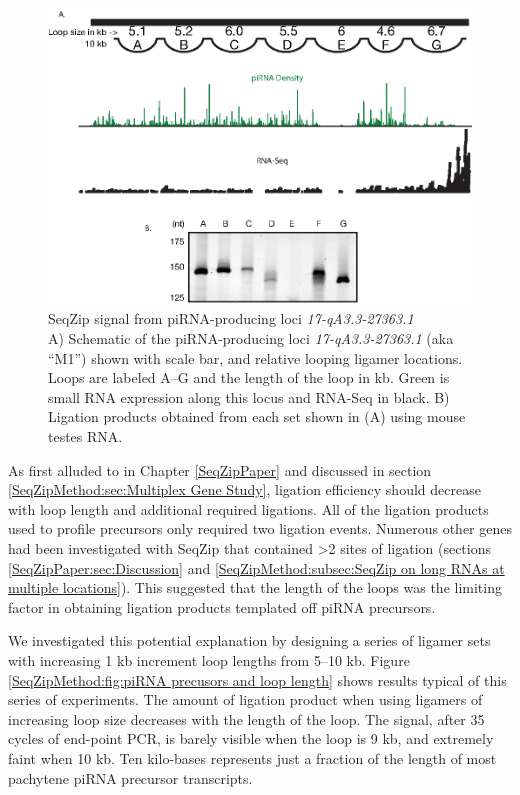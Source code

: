     \begin{figure} %
        \centering 
        \includegraphics{Figures/SeqZipMethod/piRNAPrecurserAnalyisBySeqZip.eps}
        \caption[SeqZip signal from piRNA-producing loci \textit{17-qA3.3-27363.1}]
        {
          SeqZip signal from piRNA-producing loci \textit{17-qA3.3-27363.1}\\[0.25cm]
          A) Schematic of the piRNA-producing loci \textit{17-qA3.3-27363.1} (aka ``M1'') shown with scale bar, and relative looping ligamer locations.  Loops are labeled A--G and the length of the loop in kb.  Green is small RNA expression along this locus and RNA-Seq in black. B) Ligation products obtained from each set shown in (A) using mouse testes RNA.
        	}
        \label{SeqZipMethod:fig:M1 analysis by SeqZip}
      	\end{figure}

    As first alluded to in Chapter \ref{SeqZipPaper} and discussed in section \ref{SeqZipMethod:sec:Multiplex Gene Study}, ligation efficiency should decrease with loop length and additional required ligations. All of the ligation products used to profile precursors only required two ligation events. Numerous other genes had been investigated with SeqZip that contained >2 sites of ligation (sections \ref{SeqZipPaper:sec:Discussion} and \ref{SeqZipMethod:subsec:SeqZip on long RNAs at multiple locations}). This suggested that the length of the loops was the limiting factor in obtaining ligation products templated off piRNA precursors.

    We investigated this potential explanation by designing a series of ligamer sets with increasing 1 kb increment loop lengths from 5--10 kb. Figure \ref{SeqZipMethod:fig:piRNA precusors and loop length} shows results typical of this series of experiments. The amount of ligation product when using ligamers of increasing loop size decreases with the length of the loop. The signal, after 35 cycles of end-point PCR, is barely visible when the loop is 9 kb, and extremely faint when 10 kb. Ten kilo-bases represents just a fraction of the length of most pachytene piRNA precursor transcripts. 

